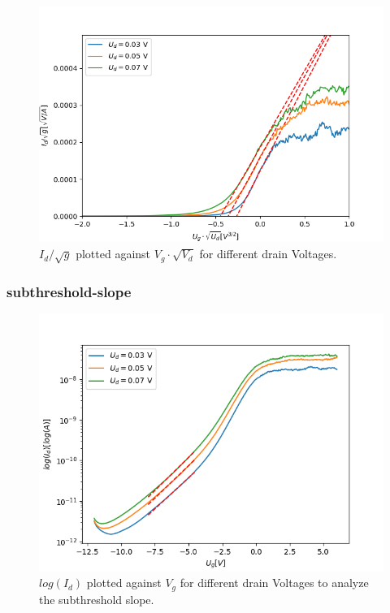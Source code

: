 \documentclass[%
 reprint,
amsmath,amssymb,
pra,
]{revtex4-1}
\begin{document}
\begin{figure}
\centering
\includegraphics[scale=0.6]{Bilder/mu.png}
\caption{$I_d/\sqrt{g}$ plotted against $V_g \cdot \sqrt{V_d}$ for different drain Voltages.}
\label{fig:linreg2}
\end{figure}

\subsubsection{subthreshold-slope}

\begin{figure}
\centering
\includegraphics[scale=0.6]{Bilder/log.png}
\caption{$log(I_d)$ plotted against $V_g$ for different drain Voltages to analyze the subthreshold slope.}
\label{fig:log}
\end{figure}
\end{document}
